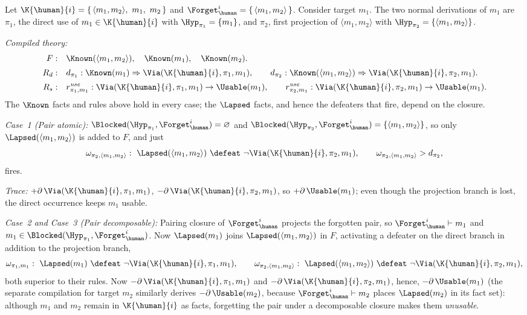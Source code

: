 \begin{example}
\label{Ex:DL-Derivability3}
Let $\K{\human}{i}=\{\,\langle m_1,m_2\rangle,\ m_1,\ m_2\,\}$ and $\Forget_{\human}^{i}=\{\,\langle m_1,m_2\rangle\,\}$. Consider target $m_1$. The two normal derivations of $m_1$ are $\pi_1$, the direct use of $m_1\in\K{\human}{i}$ with $\Hyp_{\pi_1}=\{m_1\}$, and $\pi_2$, first projection of $\langle m_1,m_2\rangle$ with $\Hyp_{\pi_2}=\{\langle m_1,m_2\rangle\}$.
 
\noindent\emph{Compiled theory:}
\begin{align*}
F:\quad & \Known(\langle m_1,m_2\rangle),\quad \Known(m_1),\quad \Known(m_2).\\[2pt]
R_d:\quad & d_{\pi_1}: \Known(m_1)\Rightarrow\Via(\K{\human}{i},\pi_1,m_1),\qquad d_{\pi_2}: \Known(\langle m_1,m_2\rangle)\Rightarrow\Via(\K{\human}{i},\pi_2,m_1).\\[2pt]
R_s:\quad & r^{\mathit{use}}_{\pi_1,m_1}: \Via(\K{\human}{i},\pi_1,m_1)\to\Usable(m_1),\qquad r^{\mathit{use}}_{\pi_2,m_1}: \Via(\K{\human}{i},\pi_2,m_1)\to\Usable(m_1).
\end{align*}
The $\Known$ facts and rules above hold in every case; the $\Lapsed$ facts, and hence the defeaters that fire, depend on the closure.
 
\noindent\emph{Case~1 (Pair atomic):}
$\Blocked(\Hyp_{\pi_1},\Forget_{\human}^{i})=\varnothing$ and $\Blocked(\Hyp_{\pi_2},\Forget_{\human}^{i})=\{\langle m_1,m_2\rangle\}$, so only $\Lapsed(\langle m_1,m_2\rangle)$ is added to $F$, and just
\[
    \omega_{\pi_2,\langle m_1,m_2\rangle}:\ \Lapsed(\langle m_1,m_2\rangle)\ \defeat\ \neg\Via(\K{\human}{i},\pi_2,m_1), \qquad \omega_{\pi_2,\langle m_1,m_2\rangle}>d_{\pi_2},
\]
fires. 

\noindent\emph{Trace:} $+\partial\,\Via(\K{\human}{i},\pi_1,m_1)$, $-\partial\,\Via(\K{\human}{i},\pi_2,m_1)$, so $+\partial\,\Usable(m_1)$; even though the projection branch is lost, the direct occurrence keeps $m_1$ usable.
 
\noindent\emph{Case~2 and Case~3 (Pair decomposable):}
Pairing closure of $\Forget_{\human}^{i}$ projects the forgotten pair, so $\Forget_{\human}^{i}\vdash m_1$ and $m_1\in\Blocked(\Hyp_{\pi_1},\Forget_{\human}^{i})$. Now $\Lapsed(m_1)$ joins $\Lapsed(\langle m_1,m_2\rangle)$ in $F$, activating a defeater on the direct branch in addition to the projection branch,
\[
\omega_{\pi_1,m_1}:\ \Lapsed(m_1)\ \defeat\ \neg\Via(\K{\human}{i},\pi_1,m_1), \qquad \omega_{\pi_2,\langle m_1,m_2\rangle}:\ \Lapsed(\langle m_1,m_2\rangle)\ \defeat\ \neg\Via(\K{\human}{i},\pi_2,m_1),
\]
both superior to their rules. Now $-\partial\,\Via(\K{\human}{i},\pi_1,m_1)$ and $-\partial\,\Via(\K{\human}{i},\pi_2,m_1)$, hence, $-\partial\,\Usable(m_1)$ (the separate compilation for target $m_2$ similarly derives $-\partial\,\Usable(m_2)$, because $\Forget_{\human}^{i}\vdash m_2$ places $\Lapsed(m_2)$ in its fact set): although $m_1$ and $m_2$ remain in $\K{\human}{i}$ as facts, forgetting the pair under a decomposable closure makes them \emph{unusable}.
\end{example}

